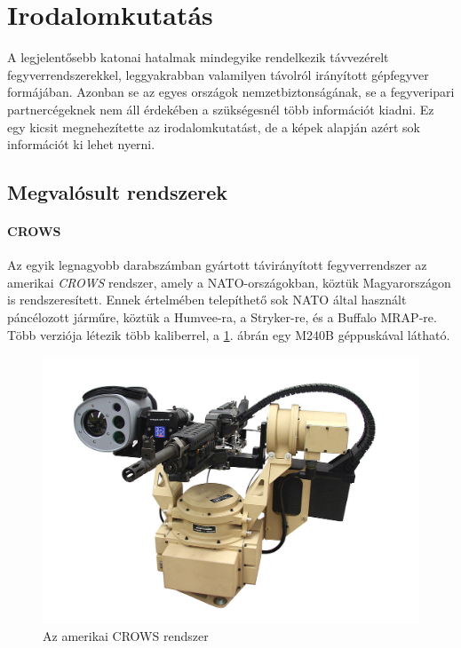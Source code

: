 \documentclass[12pt,a4paper]{article}
\begin{document}
\pagebreak


\section{Irodalomkutatás}
A legjelentősebb katonai hatalmak mindegyike rendelkezik távvezérelt fegyverrendszerekkel, leggyakrabban valamilyen távolról irányított gépfegyver formájában. Azonban se az egyes országok nemzetbiztonságának, se a fegyveripari partnercégeknek nem áll érdekében a szükségesnél több információt kiadni. Ez egy kicsit megnehezítette az irodalomkutatást, de a képek alapján azért sok információt ki lehet nyerni.

\subsection{Megvalósult rendszerek} \label{sec:valos}

\paragraph{CROWS \cite{crows}}
Az egyik legnagyobb darabszámban gyártott távirányított fegyverrendszer az amerikai \textsl{CROWS} rendszer, amely a NATO-országokban, köztük Magyarországon is rendszeresített. Ennek értelmében telepíthető sok NATO által használt páncélozott járműre, köztük a Humvee-ra, a Stryker-re, és a Buffalo MRAP-re. Több verziója létezik több kaliberrel, a \ref{fig:irod_crows}. ábrán egy M240B géppuskával látható.\\

\begin{figure}[h!]
	\centering
	\includegraphics[width=1\linewidth]{irod_crows}
	\caption{Az amerikai CROWS rendszer}
	\label{fig:irod_crows}
\end{figure}
\end{document}
